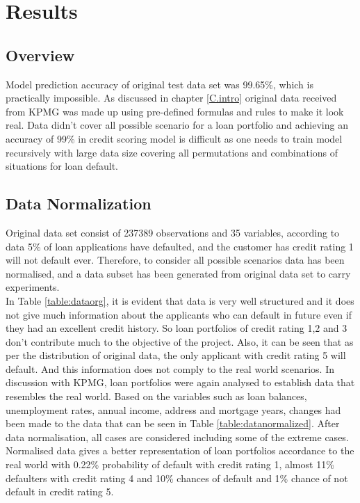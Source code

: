 %
%
%
%

\chapter{Results}\label{C.Results}

\section{Overview}
Model prediction accuracy of original test data set was 99.65\%, which is practically impossible. As discussed in chapter \ref{C.intro} original data received from KPMG was made up using pre-defined formulas and rules to make it look real. Data didn't cover all possible scenario for a loan portfolio and achieving an accuracy of 99\% in credit scoring model is difficult as one needs to train model recursively with large data size covering all permutations and combinations of situations for loan default.

\section{Data Normalization}\label{S.intro5}

Original data set consist of 237389 observations and 35 variables, according to data 5\% of loan applications have defaulted, and the customer has credit rating 1 will not default ever. Therefore, to consider all possible scenarios data has been normalised, and a data subset has been generated from original data set to carry experiments.\\

In Table \ref{table:dataorg}, it is evident that data is very well structured and it does not give much information about the applicants who can default in future even if they had an excellent credit history. So loan portfolios of credit rating 1,2 and 3 don't contribute much to the objective of the project. Also, it can be seen that as per the distribution of original data, the only applicant with credit rating 5 will default. And this information does not comply to the real world scenarios. In discussion with KPMG, loan portfolios were again analysed to establish data that resembles the real world. Based on the variables such as loan balances, unemployment rates, annual income, address and mortgage years, changes had been made to the data that can be seen in Table \ref{table:datanormalized}. After data normalisation, all cases are considered including some of the extreme cases. Normalised data gives a better representation of loan portfolios accordance to the real world with 0.22\% probability of default with credit rating 1, almost 11\% defaulters with credit rating 4 and 10\% chances of default and 1\% chance of not default in credit rating 5.   

